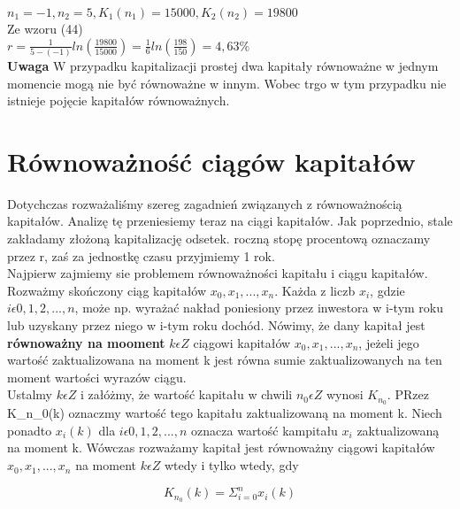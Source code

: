 \documentclass{article}
\begin{document}
$ n_1 = -1, n_2 = 5, K_1(n_1) = 15 000, K_2(n_2) = 19 800 $\\

Ze wzoru (44)\\

$ r = \frac{1}{5 - (-1)} ln (\frac{19 800}{15 000}) = \frac{1}{6} ln(\frac{198}{150}) = 4,63 \% $\\

\textbf{Uwaga} W przypadku kapitalizacji prostej dwa kapitały równoważne w jednym momencie mogą nie być równoważne w innym. Wobec trgo w tym przypadku nie istnieje pojęcie kapitałów równoważnych. 

\newpage

\section{Równoważność ciągów kapitałów}

Dotychczas rozważaliśmy szereg zagadnień związanych z równoważnością kapitałów. Analizę tę przeniesiemy teraz na ciągi kapitałów. Jak poprzednio, stale zakładamy złożoną kapitalizację odsetek. roczną stopę procentową oznaczamy przez r, zaś za jednostkę czasu przyjmiemy 1 rok.\\

Najpierw zajmiemy sie problemem równoważności kapitału i ciągu kapitałów. Rozważmy skończony ciąg kapitałów $ x_0, x_1, ..., x_n $. Każda z liczb $ x_i$, gdzie  $ i \epsilon {0,1,2, ..., n} $, może np. wyrażać nakład poniesiony przez inwestora w i-tym roku lub uzyskany przez niego w i-tym roku dochód. Nówimy, że dany kapitał jest \textbf{równoważny na mooment} $ k \epsilon Z $ ciągowi kapitałów $ x_0, x_1, ..., x_n $, jeżeli jego wartość zaktualizowana na moment k jest równa sumie zaktualizowanych na ten moment wartości wyrazów ciągu.\\

Ustalmy $ k \epsilon Z $ i załóżmy, że wartość kapitału w chwili $ n_0 \epsilon Z $ wynosi $ K_n_0 $. PRzez K_n_0(k) oznaczmy wartość tego kapitału zaktualizowaną na moment k. Niech ponadto $ x_i(k) $ dla $ i \epsilon {0, 1, 2, ..., n} $ oznacza wartość kampitału $ x_i $ zaktualizowaną na moment k. Wówczas rozważamy kapitał jest równoważny ciągowi kapitałów $ x_0, x_1, ..., x_n $ na moment $ k \epsilon Z $ wtedy i tylko wtedy, gdy\\

\begin{center}
	\begin{equation}
		K_n_0(k) = \Sigma ^n_{i=0}x_i(k)
	\end{equation}
\end{center}\\
\end{document}
